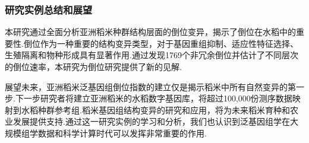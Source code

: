 \subsubsection{研究实例总结和展望}

本研究通过全面分析亚洲稻米种群结构层面的倒位变异，揭示了倒位在水稻中的重要性.倒位作为一种重要的结构变异类型，对于基因重组抑制、适应性特征选择、生殖隔离和物种形成具有显著作用.通过发现1769个非冗余倒位并估计了不同层次的倒位速率，本研究为倒位研究提供了新的见解.

展望未来，亚洲稻米泛基因组倒位指数的建立仅是揭示稻米中所有自然变异的第一步.下一步研究者将建立亚洲稻米的水稻数字基因库，将超过100,000份测序数据映射到水稻种群参考组.稻米基因组结构变异的研究和应用，将为未来稻米育种和农业发展提供支持.通过这一研究实例的学习和分析，我们也认识到泛基因组学在大规模组学数据和科学计算时代可以发挥非常重要的作用.

